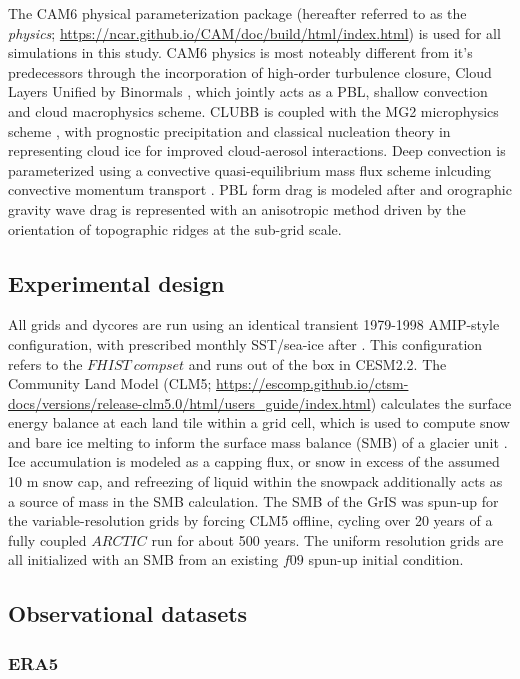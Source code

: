 \documentclass[draft]{agujournal2019}
\begin{document}
The CAM6 physical parameterization package (hereafter referred to as the \textit{physics}; \url{https://ncar.github.io/CAM/doc/build/html/index.html}) is used for all simulations in this study. CAM6 physics is most noteably different from it's predecessors through the incorporation of high-order turbulence closure, Cloud Layers Unified by Binormals \cite[CLUBB]{GETAL2002JAS,BOG2013JCLIM}, which jointly acts as a PBL, shallow convection and cloud macrophysics scheme. CLUBB is coupled with the MG2 microphysics scheme \cite{MG2}, with prognostic precipitation and classical nucleation theory in representing cloud ice for improved cloud-aerosol interactions. Deep convection is parameterized using a convective quasi-equilibrium mass flux scheme \cite{ZM1995AO,NRJ2008JC} inlcuding convective momentum transport \cite{RSG2010JAS}. PBL form drag is modeled after \cite{BBW2004QJRMS} and orographic gravity wave drag is represented with an anisotropic method driven by the orientation of topographic ridges at the sub-grid scale. 

\subsection{Experimental design}

All grids and dycores are run using an identical transient 1979-1998 AMIP-style configuration, with prescribed monthly SST/sea-ice after \cite{CESMSST}. This configuration refers to the $FHIST \ compset$ and runs out of the box in CESM2.2. The Community Land Model (CLM5; \url{https://escomp.github.io/ctsm-docs/versions/release-clm5.0/html/users_guide/index.html}) calculates the surface energy balance at each land tile within a grid cell, which is used to compute snow and bare ice melting to inform the surface mass balance (SMB) of a glacier unit \cite{VKETAL2020JGR}. Ice accumulation is modeled as a capping flux, or snow in excess of the assumed 10 m snow cap, and refreezing of liquid within the snowpack additionally acts as a source of mass in the SMB calculation. The SMB of the GrIS was spun-up for the variable-resolution grids by forcing CLM5 offline, cycling over 20 years of a fully coupled $ARCTIC$ run for about 500 years. The uniform resolution grids are all initialized with an SMB from an existing $f09$ spun-up initial condition. 

\subsection{Observational datasets}
\subsubsection{ERA5}
\end{document}

